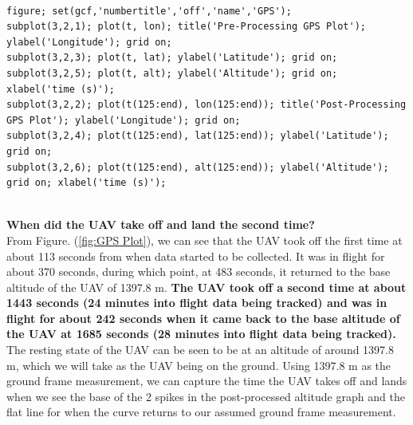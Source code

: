 \hfill
\begin{minipage}{0.3\textwidth}
    \centering
    \lstset{language=Matlab, breaklines=true, basicstyle=\ttfamily\scriptsize}
    \begin{lstlisting}
    
figure; set(gcf,'numbertitle','off','name','GPS');  
subplot(3,2,1); plot(t, lon); title('Pre-Processing GPS Plot'); ylabel('Longitude'); grid on;
subplot(3,2,3); plot(t, lat); ylabel('Latitude'); grid on;
subplot(3,2,5); plot(t, alt); ylabel('Altitude'); grid on; xlabel('time (s)');
subplot(3,2,2); plot(t(125:end), lon(125:end)); title('Post-Processing GPS Plot'); ylabel('Longitude'); grid on;
subplot(3,2,4); plot(t(125:end), lat(125:end)); ylabel('Latitude'); grid on;
subplot(3,2,6); plot(t(125:end), alt(125:end)); ylabel('Altitude'); grid on; xlabel('time (s)');
    \end{lstlisting}
    \label{fig:GPS Plot Code}
\end{minipage}


\textbf{}
\\
\textbf{When did the UAV take off and land the second time?}
\\

From Figure. (\ref{fig:GPS Plot}), we can see that the UAV took off the first time at about 113 seconds from when data started to be collected. It was in flight for about 370 seconds, during which point, at 483 seconds, it returned to the base altitude of the UAV of 1397.8 m. \textbf{The UAV took off a second time at about 1443 seconds (24 minutes into flight data being tracked) and was in flight for about 242 seconds when it came back to the base altitude of the UAV at 1685 seconds (28 minutes into flight data being tracked).} The resting state of the UAV can be seen to be at an altitude of around 1397.8 m, which we will take as the UAV being on the ground. Using 1397.8 m as the ground frame measurement, we can capture the time the UAV takes off and lands when we see the base of the 2 spikes in the post-processed altitude graph and the flat line for when the curve returns to our assumed ground frame measurement.